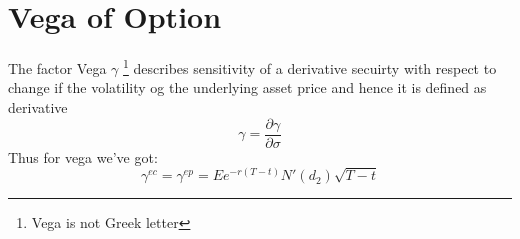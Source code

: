 \documentclass[a4paper]{article}
\begin{document}
\section{Vega of Option}
The factor Vega $\gamma$ \footnote{Vega is not Greek letter} describes sensitivity of a derivative secuirty with respect to change
if the volatility og the underlying asset price and hence it is defined as derivative 
\begin{equation}
    \gamma = \frac{\partial \gamma}{\partial \sigma}
\end{equation}
Thus for vega we've got:
\begin{equation}
    \gamma^{ec} = \gamma^{ep} = E e^{-r(T-t)}N'(d_2)\sqrt{T-t}
\end{equation}
\end{document}

